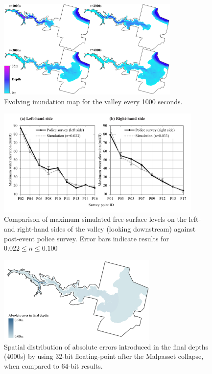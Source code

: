 \documentclass[11pt,english,a4paper]{article}
\begin{document}
\begin{figure}[tbh]
\centering
\includegraphics[width=0.8\textwidth]{Figure_9_Colour.jpg}
\caption{Evolving inundation map for the valley every 1000 seconds.}
\label{MalpassetProgression}
\end{figure}
\begin{figure}[tbh]
\centering
\includegraphics[width=0.9\textwidth]{Figure_10_Greyscale.pdf}
\caption{Comparison of maximum simulated free-surface levels on the left- and right-hand sides of the valley (looking downstream) against post-event police survey. Error bars indicate results for \(0.022 \le n \le 0.100\) }
\label{MalpassetValidation}
\end{figure}
\begin{figure}[tbh]
\centering
\includegraphics[width=0.7\textwidth]{Figure_11_Colour.jpg}
\caption{Spatial distribution of absolute errors introduced in the final depths (4000s) by using 32-bit floating-point after the Malpasset collapse, when compared to 64-bit results.}
\label{FPErrorFinal}
\end{figure}
\end{document}

